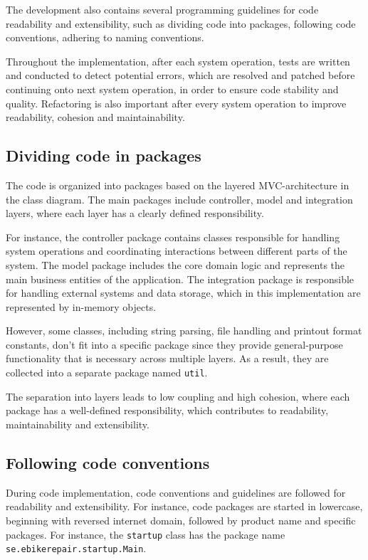\documentclass[a4paper]{scrartcl}
\begin{document}
The development also contains several programming guidelines for code readability and extensibility, such as dividing code into packages, following code conventions, adhering to naming conventions. 

Throughout the implementation, after each system operation, tests are written and conducted to detect potential errors, which are resolved and patched before continuing onto next system operation, in order to ensure code stability and quality. Refactoring is also important after every system operation to improve readability, cohesion and maintainability.

\subsection{Dividing code in packages}

The code is organized into packages based on the layered MVC-architecture in the class diagram. The main packages include controller, model and integration layers, where each layer has a clearly defined responsibility.

For instance, the controller package contains classes responsible for handling system operations and coordinating interactions between different parts of the system. The model package includes the core domain logic and represents the main business entities of the application. The integration package is responsible for handling external systems and data storage, which in this implementation are represented by in-memory objects.

However, some classes, including string parsing, file handling and printout format constants, don't fit into a specific package since they provide general-purpose functionality that is necessary across multiple layers. As a result, they are collected into a separate package named \texttt{util}.

The separation into layers leads to low coupling and high cohesion, where each package has a well-defined responsibility, which contributes to readability, maintainability and extensibility.


\subsection{Following code conventions}

During code implementation, code conventions and guidelines are followed for readability and extensibility. For instance, code packages are started in lowercase, beginning with reversed internet domain, followed by product name and specific packages. For instance, the \texttt{startup} class has the package name \texttt{se.ebikerepair.startup.Main}.
\end{document}
